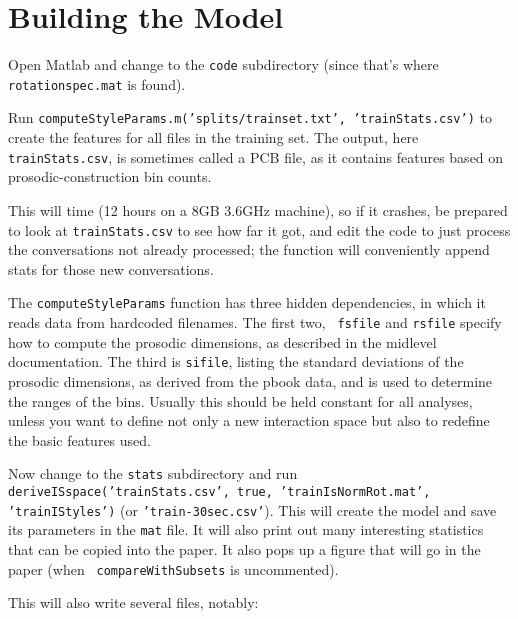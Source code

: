 \documentclass[11pt]{article}
\begin{document}
\section{Building the Model}

Open Matlab and change to the {\tt code} subdirectory (since that's
where {\tt rotationspec.mat} is found).

Run {\tt computeStyleParams.m('splits/trainset.txt', 'trainStats.csv')}
to create the features for all files in the training set.  The output,
here {\tt trainStats.csv}, is sometimes called a PCB file, as it
contains features based on prosodic-construction bin counts.

This will time (12 hours on a 8GB 3.6GHz machine), so if it crashes,
be prepared to look at {\tt trainStats.csv} to see how far it got, and
edit the code to just process the conversations not already processed;
the function will conveniently append stats for those new
conversations.

The {\tt computeStyleParams} function has three hidden dependencies,
in which it reads data from hardcoded filenames.  The first two, {\tt
  fsfile} and {\tt rsfile} specify how to compute the prosodic
dimensions, as described in the midlevel documentation. The third is
{\tt sifile}, listing the standard deviations of the prosodic
dimensions, as derived from the pbook data, and is used to determine
the ranges of the bins. Usually this should be held constant for all
analyses, unless you want to define not only a new interaction space
but also to redefine the basic features used.

\medskip
Now change to the {\tt stats} subdirectory and run {\tt
  deriveISspace('trainStats.csv', true, 'trainIsNormRot.mat',
  'trainIStyles')} (or {\tt 'train-30sec.csv'}).  This will create the
model and save its parameters in the {\tt mat} file. It will also
print out many interesting statistics that can be copied into the
paper.  It also pops up a figure that will go in the paper (when {\tt
  compareWithSubsets} is uncommented).

This will also write several files, notably:
\end{document}
